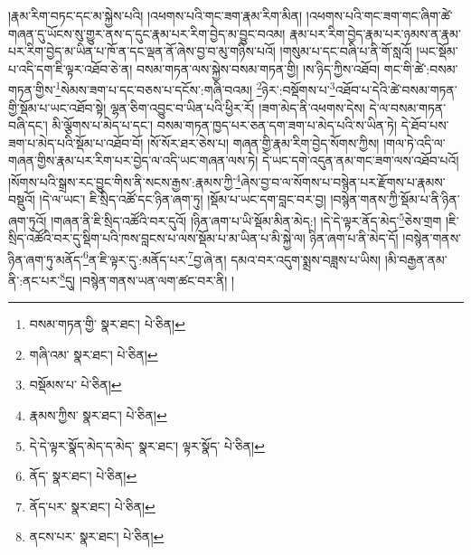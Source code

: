 །རྣམ་རིག་བཏང་དང་མ་སྐྱེས་པའི། །འཕགས་པའི་གང་ཟག་རྣམ་རིག་མིན། །འཕགས་པའི་གང་ཟག་གང་ཞིག་ཚེ་གཞན་དུ་ཡོངས་སུ་གྱུར་ནས་ད་དུང་རྣམ་པར་རིག་བྱེད་མ་བྱུང་བའམ། རྣམ་པར་རིག་བྱེད་རྣམ་པར་ཉམས་ན་རྣམ་པར་རིག་བྱེད་མ་ཡིན་པ་ཁོ་ན་དང་ལྡན་ནོ་ཞེས་བྱ་བ་མུ་གཉིས་པའོ། །གསུམ་པ་དང་བཞི་པ་ནི་གོ་སླའོ། །ཡང་སྡོམ་པ་འདི་དག་ཇི་ལྟར་འཐོབ་ཅེ་ན། བསམ་གཏན་ལས་སྐྱེས་བསམ་གཏན་གྱི། །ས་ཉིད་ཀྱིས་འཐོབ། གང་གི་ཚེ་:བསམ་གཏན་གྱིས་\footnote{བསམ་གཏན་གྱི་  སྣར་ཐང་།  པེ་ཅིན། }སེམས་ཟག་པ་དང་བཅས་པ་དངོས་:གཞི་བའམ། \footnote{གཞི་འམ་  སྣར་ཐང་།  པེ་ཅིན། }ཉེར་:བསྡོགས་པ་\footnote{བསྡོམས་པ་  པེ་ཅིན། }འཐོབ་པ་དེའི་ཚེ་བསམ་གཏན་གྱི་སྡོམ་པ་ཡང་འཐོབ་སྟེ། ལྷན་ཅིག་འབྱུང་བ་ཡིན་པའི་ཕྱིར་རོ། །ཟག་མེད་ནི་འཕགས་དེས། དེ་ལ་བསམ་གཏན་བཞི་དང་། མི་ལྕོགས་པ་མེད་པ་དང་། བསམ་གཏན་ཁྱད་པར་ཅན་དག་ཟག་པ་མེད་པའི་ས་ཡིན་ཏེ། དེ་ཐོབ་པས་ཟག་པ་མེད་པའི་སྡོམ་པ་འཐོབ་བོ། །སོ་སོར་ཐར་ཅེས་པ། གཞན་གྱི་རྣམ་རིག་བྱེད་སོགས་ཀྱིས། །གལ་ཏེ་འདི་ལ་གཞན་གྱིས་རྣམ་པར་རིག་པར་བྱེད་ལ་འདི་ཡང་གཞན་ལས་ཏེ། དེ་ཡང་དགེ་འདུན་ནམ་གང་ཟག་ལས་འཐོབ་པའོ། །སོགས་པའི་སྒྲས་རང་བྱུང་གིས་ནི་སངས་རྒྱས་:རྣམས་ཀྱི་\footnote{རྣམས་ཀྱིས་  སྣར་ཐང་།  པེ་ཅིན། }ཞེས་བྱ་བ་ལ་སོགས་པ་བསྙེན་པར་རྫོགས་པ་རྣམས་བསྡུའོ། །དེ་ལ་ཡང་། ཇི་སྲིད་འཚོ་དང་ཉིན་ཞག་ཏུ། །སྡོམ་པ་ཡང་དག་བླང་བར་བྱ། །བསྙེན་གནས་ཀྱི་སྡོམ་པ་ནི་ཉིན་ཞག་ཏུའོ། །གཞན་ནི་ཇི་སྲིད་འཚོའི་བར་དུའོ། །ཉིན་ཞག་པ་ཡི་སྡོམ་མིན་མེད:། །དེ་དེ་ལྟར་ནོད་མེད་\footnote{དེ་དེ་ལྟར་སྣོད་མེད་ད་མེད་  སྣར་ཐང་། ལྟར་སྣོད་  པེ་ཅིན། }ཅེས་གྲག །ཇི་སྲིད་འཚོའི་བར་དུ་སྡིག་པའི་ཁས་བླངས་པ་ལས་སྡོམ་པ་མ་ཡིན་པ་མི་སྐྱེ་ལ། ཉིན་ཞག་པ་ནི་མེད་དོ། །བསྙེན་གནས་ཉིན་ཞག་ཏུ་མནོད་\footnote{ནོད་  སྣར་ཐང་།  པེ་ཅིན། }ན་ཇི་ལྟར་དུ་:མནོད་པར་\footnote{ནོད་པར་  སྣར་ཐང་།  པེ་ཅིན། }བྱ་ཞེ་ན། དམའ་བར་འདུག་སྨྲས་བཟླས་པ་ཡིས། །མི་བརྒྱན་ནམ་ནི་:ནང་པར་\footnote{ནངས་པར་  སྣར་ཐང་།  པེ་ཅིན། }དུ། །བསྙེན་གནས་ཡན་ལག་ཚང་བར་ནི། །
